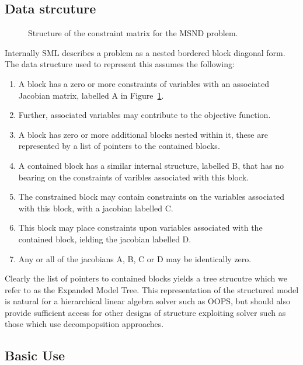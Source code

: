\documentclass[10pt,a4paper]{book}
\begin{document}
\subsection{Data strcuture}
\begin{figure}
   \caption{ \label{Iface eg}
      Structure of the constraint matrix for the MSND problem.
   }
   \begin{center}
   \end{center}
\end{figure}

Internally  SML describes a problem as a nested bordered block diagonal form.
The data structure used to represent this assumes the following:
\begin{enumerate}
   \item A block has a zero or more constraints of variables with an associated
      Jacobian matrix, labelled A in Figure~\ref{Iface eg}.
   \item Further, associated variables may contribute to the objective function.
   \item A block has zero or more additional blocks nested within it, these are
      represented by a list of pointers to the contained blocks.
   \item A contained block has a similar internal structure, labelled B, that
      has no bearing on the constraints of varibles associated with this block.
   \item The constrained block may contain constraints on the variables
      associated with this block, with a jacobian labelled C.
   \item This block may place constraints upon variables associated with
      the contained block, ielding the jacobian labelled D.
   \item Any or all of the jacobians A, B, C or D may be identically zero.
\end{enumerate}

Clearly the list of pointers to contained blocks yields a tree strucutre which
we refer to as the Expanded Model Tree.  This representation of the structured
model is natural for a hierarchical linear algebra solver such as OOPS, but
should also provide sufficient access for other designs of structure exploiting
solver such as those which use decompopsition approaches.

\subsection{Basic Use}
\end{document}
